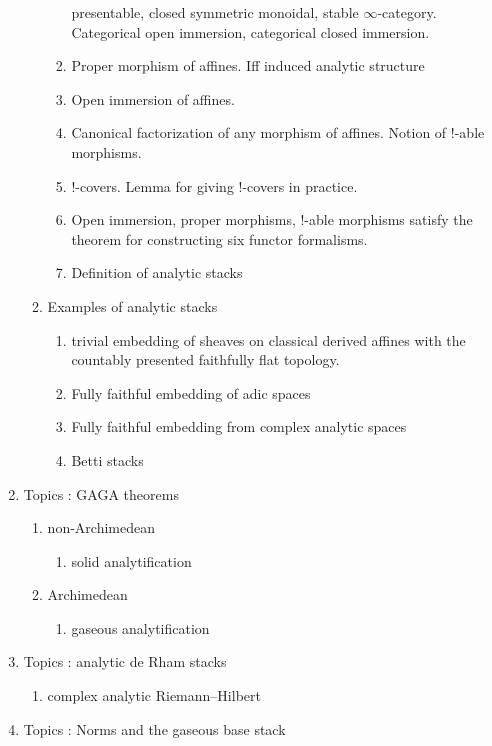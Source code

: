 \documentclass{article}
\begin{document}
\begin{enumerate}
\begin{enumerate}
\begin{enumerate}
            presentable, closed symmetric monoidal, stable $\infty$-category.
            Categorical open immersion, categorical closed immersion.
            \item Proper morphism of affines.
            Iff induced analytic structure
            \item Open immersion of affines.
            \item Canonical factorization of any morphism of affines.
            Notion of !-able morphisms.
            \item !-covers. Lemma for giving !-covers in practice.
            \item Open immersion, proper morphisms, !-able morphisms
            satisfy the theorem for constructing six functor formalisms.
            \item Definition of analytic stacks
        \end{enumerate}
        \item Examples of analytic stacks
        \begin{enumerate}
          \item trivial embedding of sheaves on classical derived affines
          with the countably presented faithfully flat topology.
          \item Fully faithful embedding of adic spaces
          \item Fully faithful embedding from complex analytic spaces
          \item Betti stacks
        \end{enumerate}
    \end{enumerate}
    \item Topics : GAGA theorems
    \begin{enumerate}
        \item non-Archimedean
        \begin{enumerate}
            \item solid analytification
        \end{enumerate}
        \item Archimedean
        \begin{enumerate}
            \item gaseous analytification
        \end{enumerate}
    \end{enumerate}
    \item Topics : analytic de Rham stacks
    \begin{enumerate}
        \item complex analytic Riemann--Hilbert
    \end{enumerate}
    \item Topics : Norms and the gaseous base stack
\end{enumerate}
\end{document}
